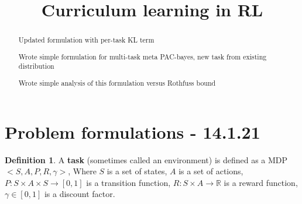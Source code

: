 \documentclass[letterpaper]{article}
\title{Curriculum learning in RL}
\theoremstyle{definition}
\newtheorem{defn}{Definition}[section]
\begin{document}
	
	\maketitle
	\begin{abstract}
		
		Updated formulation with per-task KL term
		
		Wrote simple formulation for multi-task meta PAC-bayes, new task from existing distribution
		
		Wrote simple analysis of this formulation versus Rothfuss bound
	\end{abstract}

\tableofcontents

\section{Problem formulations - 14.1.21} \label{sec:formulation}
\begin{defn}
	A \textbf{task} (sometimes called an environment) is defined as a MDP $<S,A,P,R,\gamma>$,
	Where $S$ is a set of states, $A$ is a set of actions, $P:S\times A\times S\rightarrow [0,1]$ is a transition function, 
	$R:S\times A\rightarrow \mathbb{R}$ is a reward function, $\gamma\in[0,1]$ is a discount factor.
\end{defn}
\end{document}
